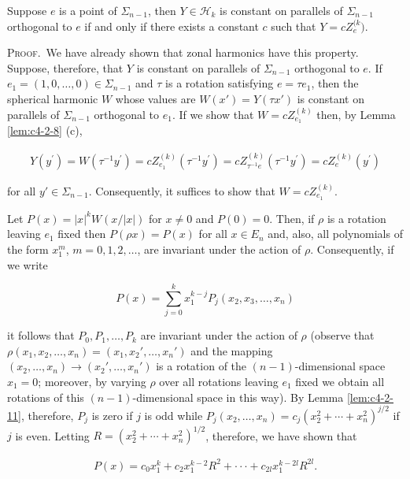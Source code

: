 \begin{theorem}
\label{thm:c4-2-12}
Suppose $e$ is a point of $\Sigma_{n-1}$, then $Y \in \mathcal{H}_k$ is constant on parallels of $\Sigma_{n-1}$ orthogonal to $e$ if and only if there exists a constant $c$ such that $Y = c Z_e^{(k})$.
\end{theorem}

\textsc{Proof.}\ We have already shown that zonal harmonics have this property. Suppose, therefore, that $Y$ is constant on parallels of $\Sigma_{n-1}$ orthogonal to $e$. If $e_1 = (1, 0, \ldots, 0) \in \Sigma_{n-1}$ and $\tau$ is a rotation satisfying $e = \tau e_1$, then the spherical harmonic $W$ whose values are $W(x') = Y(\tau x')$ is constant on parallels of $\Sigma_{n-1}$ orthogonal to $e_1$. If we show that $W = c Z_{e_1}^{(k)}$ then, by Lemma \ref{lem:c4-2-8} (c),

\[
\begin{array}{r}{Y(y^{\prime})=W(\tau^{-1}y^{\prime})=c Z_{e_{1}}^{(k)}(\tau^{-1}y^{\prime})=c Z_{\tau^{-1}e}^{(k)}(\tau^{-1}y^{\prime})=c Z_{e}^{(k)}(y^{\prime})}\end{array}
\]

for all $y' \in \Sigma_{n-1}$. Consequently, it suffices to show that $W = cZ_{e_1}^{(k)}$.

Let $P(x) = |x|^k W(x/|x|)$ for $x \neq 0$ and $P(0) = 0$. Then, if $\rho$ is a rotation leaving $e_1$ fixed then $P(\rho x) = P(x)$ for all $x \in E_n$ and, also, all polynomials of the form $x_1^m$, $m = 0, 1, 2, \ldots$, are invariant under the action of $\rho$. Consequently, if we write

\[
P(x)=\sum_{j=0}^{k}x_{1}^{k-j}P_{j}(x_{2},x_{3},\ldots,x_{n})
\]

it follows that $P_0, P_1, \ldots, P_k$ are invariant under the action of $\rho$ (observe that $\rho(x_1, x_2, \ldots, x_n) = (x_1, x_2', \ldots, x_n')$ and the mapping $(x_2, \ldots, x_n) \to (x_2', \ldots, x_n')$ is a rotation of the $(n-1)$-dimensional space $x_1 = 0$; moreover, by varying $\rho$ over all rotations leaving $e_1$ fixed we obtain all rotations of this $(n-1)$-dimensional space in this way). By Lemma \ref{lem:c4-2-11}, therefore, $P_j$ is zero if $j$ is odd while $P_j(x_2, \ldots, x_n) = c_j(x_2^2 + \cdots + x_n^2)^{j/2}$ if $j$ is even. Letting $R = (x_2^2 + \cdots + x_n^2)^{1/2}$, therefore, we have shown that

\begin{equation}
\tag{i}
\begin{array}{r}{P(x)=c_{0}x_{1}^{k}+c_{2}x_{1}^{k-2}R^{2}+\cdot\cdot\cdot+c_{2l}x_{1}^{k-2l}R^{2l}.}\end{array}
\end{equation}

